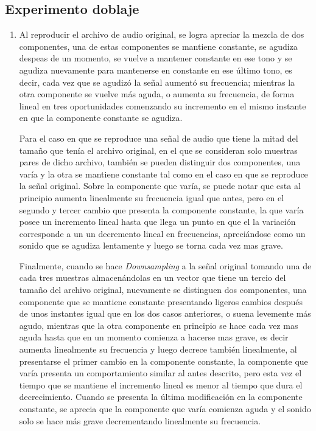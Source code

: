 \subsection{Experimento doblaje}
\begin{enumerate}
    \item Al reproducir el archivo de audio original, se logra apreciar la mezcla de dos componentes, una de estas componentes se mantiene constante, se agudiza despeas de un momento, se vuelve a mantener constante en ese tono y  se agudiza nuevamente para mantenerse en constante en ese último tono, es decir, cada vez que se agudizó la señal aumentó su frecuencia; mientras la otra componente se vuelve más aguda, o aumenta su frecuencia,  de forma lineal en tres oportunidades comenzando su incremento en el mismo instante en que la componente constante se agudiza. 
    
    Para el caso en que se reproduce una señal de audio que tiene la mitad del tamaño que tenía el archivo original, en el que se consideran solo muestras pares de dicho archivo, también se pueden distinguir dos componentes, una varía y la otra se mantiene constante tal como en el caso en que se reproduce la señal original. Sobre la componente que varía, se puede notar que esta al principio  aumenta linealmente su frecuencia igual que antes, pero en el segundo y tercer cambio que presenta la componente constante, la que varía posee un incremento lineal hasta que llega un punto en que el la variación corresponde a un  un decremento lineal en frecuencias, apreciándose como un sonido que se agudiza lentamente   y luego se torna cada vez mas grave.
    
    Finalmente, cuando se hace \textit{Downsampling} a la señal original tomando una de cada tres muestras almacenándolas en un vector que tiene un tercio del tamaño del archivo original, nuevamente se distinguen dos componentes, una componente que se mantiene constante presentando ligeros cambios después de unos instantes  igual que en los dos casos anteriores, o suena levemente más agudo, mientras que la otra componente en principio se hace cada vez mas aguda hasta que en un momento comienza a hacerse mas grave, es decir aumenta linealmente su frecuencia y luego decrece también linealmente, al presentarse el primer cambio en la componente constante, la componente que varía presenta un comportamiento similar al antes descrito,  pero esta vez el tiempo que se mantiene el incremento lineal es menor al tiempo  que dura el decrecimiento. Cuando se presenta la última modificación en la componente constante, se aprecia que  la componente que varía comienza aguda y el sonido solo se hace más grave decrementando linealmente su frecuencia.
    

\end{enumerate}
